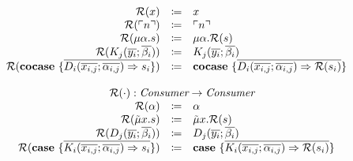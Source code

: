 \[\begin{array}{rcll}
    \redundancy{x} & \coloneq & x & \\
    \redundancy{\lit{n}} & \coloneq & \lit{n} & \\
    \redundancy{\mu\alpha.s} & \coloneq & \mu\alpha.\redundancy{s} & \\
    \redundancy{K_j(\overline{y_i}; \overline{\beta_i})} & \coloneq & K_j(\overline{y_i}; \overline{\beta_i}) & \\
    \redundancy{\cocase{\overline{D_i(\overline{x_{i,j}}; \overline{\alpha_{i,j}}) \Rightarrow s_i}}} & \coloneq & \cocase{\overline{D_i(\overline{x_{i,j}}; \overline{\alpha_{i,j}}) \Rightarrow \redundancy{s_i}}} & \\
    \\
    \multicolumn{4}{c}{\redundancy{\cdot} : \emph{Consumer} \rightarrow \emph{Consumer}}\\
    \redundancy{\alpha} & \coloneq & \alpha & \\
    \redundancy{\tilde{\mu}x.s} & \coloneq & \tilde{\mu}x.\redundancy{s} & \\
    \redundancy{D_j(\overline{y_i}; \overline{\beta_i})} & \coloneq & D_j(\overline{y_i}; \overline{\beta_i}) & \\
    \redundancy{\case{\overline{K_i(\overline{x_{i,j}}; \overline{\alpha_{i,j}}) \Rightarrow s_i}}} & \coloneq & \case{\overline{K_i(\overline{x_{i,j}}; \overline{\alpha_{i,j}}) \Rightarrow \redundancy{s_i}}} & \\
  \end{array}
\]
